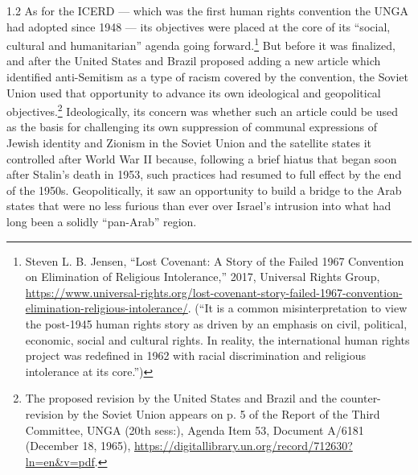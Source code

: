 \documentclass[../unravbook.tex]{subfiles}
\begin{document}
\begin{spacing}{1.2}
As for the ICERD --- which was the first human rights convention the UNGA had adopted since 1948 --- its objectives were placed at the core of its \enquote{social, cultural and humanitarian} agenda going forward.\footnote{Steven L. B. Jensen, ``Lost Covenant: A Story of the Failed 1967 Convention on Elimination of Religious Intolerance,'' 2017, Universal Rights Group, \url{https://www.universal-rights.org/lost-covenant-story-failed-1967-convention-elimination-religious-intolerance/}. (``It is a common misinterpretation to view the post-1945 human rights story as driven by an emphasis on civil, political, economic, social and cultural rights. In reality, the international human rights project was redefined in 1962 with racial discrimination and religious intolerance at its core.'')} But before it was finalized, and after the United States and Brazil proposed adding a new article which identified anti-Semitism as a type of racism covered by the convention, the Soviet Union used that opportunity to advance its own ideological and geopolitical objectives.\footnote{The proposed revision by the United States and Brazil and the counter-revision by the Soviet Union appears on p. 5 of the Report of the Third Committee, UNGA (20th sess:), Agenda Item 53, Document A/6181 (December 18, 1965), \url{https://digitallibrary.un.org/record/712630?ln=en\&v=pdf}.} Ideologically, its concern was whether such an article could be used as the basis for challenging its own suppression of communal expressions of Jewish identity and Zionism in the Soviet Union and the satellite states it controlled after World War II because, following a brief hiatus that began soon after Stalin's death in 1953, such practices had resumed to full effect by the end of the 1950s. Geopolitically, it saw an opportunity to build a bridge to the Arab states that were no less furious than ever over Israel's intrusion into what had long been a solidly \enquote{pan-Arab} region.


\end{spacing}
\end{document}
